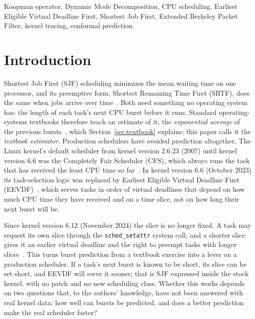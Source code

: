 \documentclass[conference,onecolumn,11pt]{IEEEtran}
\begin{document}
\begin{IEEEkeywords}
Koopman operator, Dynamic Mode Decomposition, CPU scheduling, Earliest Eligible Virtual Deadline First, Shortest Job First, Extended Berkeley Packet Filter, kernel tracing, conformal prediction
\end{IEEEkeywords}


\section{Introduction}
Shortest Job First (SJF) scheduling minimizes the mean waiting time on one processor, and its preemptive form, Shortest Remaining Time First (SRTF), does the same when jobs arrive over time~\cite{silberschatz2018}. Both need something no operating system has: the length of each task's next CPU burst before it runs. Standard operating-systems textbooks therefore teach an estimate of it, the \emph{exponential average} of the previous bursts~\cite{silberschatz2018,tanenbaum2015}, which Section~\ref{sec:textbook} explains; this paper calls it the \emph{textbook estimator}. Production schedulers have avoided prediction altogether. The Linux kernel's default scheduler from kernel version 2.6.23 (2007) until kernel version 6.6 was the Completely Fair Scheduler (CFS), which always runs the task that has received the least CPU time so far~\cite{cfsdoc}. In kernel version 6.6 (October 2023) its task-selection logic was replaced by Earliest Eligible Virtual Deadline First (EEVDF)~\cite{stoica1995,corbet2023eevdf}, which serves tasks in order of virtual deadlines that depend on how much CPU time they have received and on a time slice, not on how long their next burst will be.

Since kernel version 6.12 (November 2024) the slice is no longer fixed. A task may request its own slice through the \texttt{sched\_setattr} system call, and a shorter slice gives it an earlier virtual deadline and the right to preempt tasks with longer slices~\cite{corbet2024,eevdfdoc}. This turns burst prediction from a textbook exercise into a lever on a production scheduler. If a task's next burst is known to be short, its slice can be set short, and EEVDF will serve it sooner; that is SJF expressed inside the stock kernel, with no patch and no new scheduling class. Whether this works depends on two questions that, to the authors' knowledge, have not been answered with real kernel data: how well can bursts be predicted, and does a better prediction make the real scheduler faster?
\end{document}
